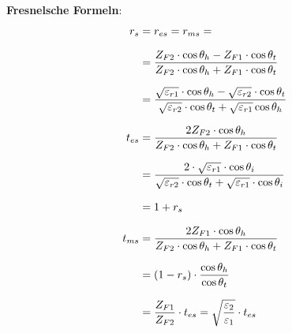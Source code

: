 \textbf{Fresnelsche Formeln}:
\begin{equation*}
	\setlength{\jot}{10pt}
	\begin{aligned}
		    r_s    & =  r_{es} = r_{ms} =                                                                                                                                            \\
		& = \frac{Z_{F2} \cdot \cos \theta_h-Z_{F1} \cdot \cos \theta_t}{Z_{F2} \cdot \cos \theta_h+Z_{F1} \cdot \cos \theta_t}                                           \\
		& = \frac{\sqrt{\varepsilon_{r1}}\cdot\cos\theta_h - \sqrt{\varepsilon_{r2}}\cdot\cos\theta_t}{\sqrt{\varepsilon_{r2}}\cdot\cos\theta_t + \sqrt{\varepsilon_{r1}}\cos\theta_h} \\
		t_{es} & =\frac{2 Z_{F2} \cdot \cos \theta_h}{Z_{F2} \cdot \cos \theta_h+Z_{F1} \cdot \cos \theta_t}                                                              \\
		& = \frac{2\cdot\sqrt{\varepsilon_{r1}}\cdot\cos\theta_i}{\sqrt{\varepsilon_{r2}}\cdot\cos\theta_t + \sqrt{\varepsilon_{r1}}\cdot\cos\theta_i}             \\
		& = 1+r_s\\
		t_{ms} & = \frac{2 Z_{F1} \cdot \cos \theta_h}{Z_{F2} \cdot \cos \theta_h+Z_{F1} \cdot \cos \theta_t}                                                              \\
		& = (1 - r_s) \cdot \dfrac{\cos \theta_h}{\cos \theta_t}                                                                                                          \\
		& = \frac{Z_{F1}}{Z_{F2}}\cdot t_{es} = \sqrt{\frac{\varepsilon_2}{\varepsilon_1}}\cdot t_{es}                                                                                                                          
	\end{aligned}
\end{equation*}


